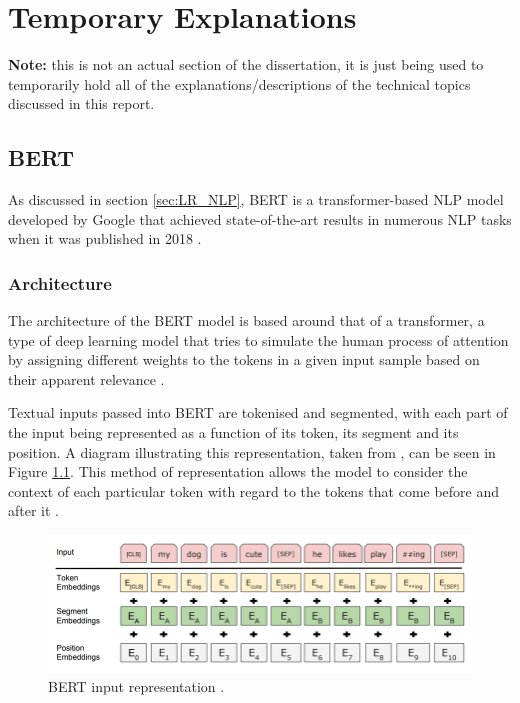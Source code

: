 \chapter{Temporary Explanations}

\textbf{Note:} this is not an actual section of the dissertation, it is just being used to temporarily hold all of the explanations/descriptions of the technical topics discussed in this report.

\section{BERT}

As discussed in section \ref{sec:LR_NLP}, BERT is a transformer-based NLP model developed by Google that achieved state-of-the-art results in numerous NLP tasks when it was published in 2018 \cite{Devlin2018_BERT}.

\subsection{Architecture}

The architecture of the BERT model is based around that of a transformer, a type of deep learning model that tries to simulate the human process of attention by assigning different weights to the tokens in a given input sample based on their apparent relevance \cite{Bahdanau2014_Attention} \cite{sabharwal2021bert}.

Textual inputs passed into BERT are tokenised and segmented, with each part of the input being represented as a function of its token, its segment and its position. A diagram illustrating this representation, taken from \cite{Devlin2018_BERT}, can be seen in Figure \ref{fig:Explain_BERTEmbeddings}. This method of representation allows the model to consider the context of each particular token with regard to the tokens that come before and after it \cite{sabharwal2021bert}.

\begin{figure}[ht]
    \centering
    \includegraphics[scale=0.5]{figures/99_explanations/02_BERTEmbeddings.png}
    \caption{BERT input representation \cite{Devlin2018_BERT}.}
    \label{fig:Explain_BERTEmbeddings}
\end{figure}

